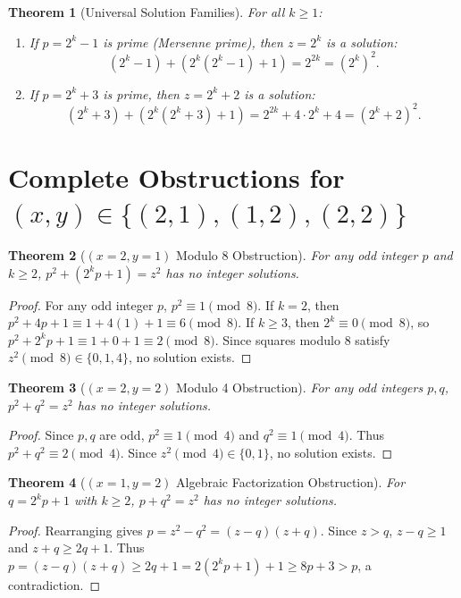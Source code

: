 \documentclass[11pt,a4paper]{article}
\newtheorem{theorem}{Theorem}
\begin{document}
\begin{theorem}[Universal Solution Families]
For all $k \ge 1$:
\begin{enumerate}
  \item If $p = 2^k - 1$ is prime (Mersenne prime), then $z = 2^k$ is a solution:
  \[ (2^k - 1) + (2^k(2^k - 1) + 1) = 2^{2k} = (2^k)^2. \]
  \item If $p = 2^k + 3$ is prime, then $z = 2^k + 2$ is a solution:
  \[ (2^k + 3) + (2^k(2^k + 3) + 1) = 2^{2k} + 4 \cdot 2^k + 4 = (2^k + 2)^2. \]
\end{enumerate}
\end{theorem}

\section{Complete Obstructions for $(x, y) \in \{(2, 1), (1, 2), (2, 2)\}$}

\begin{theorem}[$(x=2, y=1)$ Modulo 8 Obstruction]
For any odd integer $p$ and $k \ge 2$, $p^2 + (2^k p + 1) = z^2$ has no integer solutions.
\end{theorem}
\begin{proof}
For any odd integer $p$, $p^2 \equiv 1 \pmod 8$.
If $k = 2$, then $p^2 + 4p + 1 \equiv 1 + 4(1) + 1 \equiv 6 \pmod 8$.
If $k \ge 3$, then $2^k \equiv 0 \pmod 8$, so $p^2 + 2^k p + 1 \equiv 1 + 0 + 1 \equiv 2 \pmod 8$.
Since squares modulo 8 satisfy $z^2 \pmod 8 \in \{0, 1, 4\}$, no solution exists.
\end{proof}

\begin{theorem}[$(x=2, y=2)$ Modulo 4 Obstruction]
For any odd integers $p, q$, $p^2 + q^2 = z^2$ has no integer solutions.
\end{theorem}
\begin{proof}
Since $p, q$ are odd, $p^2 \equiv 1 \pmod 4$ and $q^2 \equiv 1 \pmod 4$.
Thus $p^2 + q^2 \equiv 2 \pmod 4$. Since $z^2 \pmod 4 \in \{0, 1\}$, no solution exists.
\end{proof}

\begin{theorem}[$(x=1, y=2)$ Algebraic Factorization Obstruction]
For $q = 2^k p + 1$ with $k \ge 2$, $p + q^2 = z^2$ has no integer solutions.
\end{theorem}
\begin{proof}
Rearranging gives $p = z^2 - q^2 = (z - q)(z + q)$.
Since $z > q$, $z - q \ge 1$ and $z + q \ge 2q + 1$.
Thus $p = (z - q)(z + q) \ge 2q + 1 = 2(2^k p + 1) + 1 \ge 8p + 3 > p$, a contradiction.
\end{proof}
\end{document}
